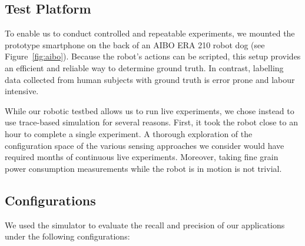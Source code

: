\subsection{Test Platform}
\label{sec:testPlatform}

To enable us to conduct controlled and repeatable experiments, we
mounted the prototype smartphone on the back of an AIBO ERA 210 robot
dog (see Figure~\ref{fig:aibo}).  Because the robot's actions can be
scripted, this setup provides an efficient and reliable way to
determine ground truth.  In contrast, labelling data collected from
human subjects with ground truth is error prone and labour intensive.

While our robotic testbed allows us to run 
live experiments, we chose instead to use trace-based simulation for 
several reasons.  First, it
took the robot close to an hour to complete a single experiment.  A
thorough exploration of the configuration space of the various sensing
approaches we consider would have required months of continuous
live experiments.  Moreover, taking fine grain power consumption
measurements while the robot is in motion is not trivial.


\subsection{Configurations}
\label{sec:configurations}
We used the simulator to evaluate the recall and precision of 
our applications under the following configurations:

